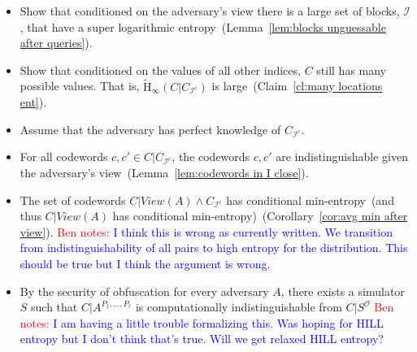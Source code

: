 \documentclass[11pt]{article}
\newcommand{\corref}[1]{\mbox{Corollary~\ref{#1}}}
\newcommand{\lemref}[1]{\mbox{Lemma~\ref{#1}}}
\newcommand{\clref}[1]{\mbox{Claim~\ref{#1}}}
\newcommand{\Hav}{\tilde{\mathrm{H}}_\infty}
\newcommand{\authnote}[2]{{\textcolor{red}{\textsf{#1 notes: }\textcolor{blue}{ #2}}\marginpar{\textcolor{red}{\textbf{!!!!!}}}}}
\newcommand{\authnote}[2]{}
\newcommand{\bnote}[1]{{\authnote{Ben}{#1}}}
\begin{document}
\begin{itemize}
\item Show that conditioned on the adversary's view there is a large set of blocks, $\mathcal{I}$, that have a super logarithmic entropy~(\lemref{lem:blocks unguessable after queries}).
\item Show that conditioned on the values of all other indices, $C$ still has many possible values.  That is, $\Hav(C | C_{\mathcal{I}^c})$ is large~(\clref{cl:many locations ent}).
\item Assume that the adversary has perfect knowledge of $C_{\mathcal{I}^c}$.
\item For all codewords $c, c' \in C| C_{\mathcal{I}^c}$, the codewords $c, c'$ are indistinguishable given the adversary's view~(\lemref{lem:codewords in I close}).
\item The set of codewords $C| View(A) \wedge C_{\mathcal{I}^c}$ has conditional min-entropy~(and thus $C|View(A)$ has conditional min-entropy)~(\corref{cor:avg min after view}).  
\bnote{I think this is wrong as currently written.  We transition from indistinguishability of all pairs to high entropy for the distribution.  This should be true but I think the argument is wrong.}
\item By the security of obfuscation for every adversary $A$, there exists a simulator $S$ such that $C | A^{P_1,..., P_\ell}$ is computationally indistinguishable from $C | S^{\mathcal{O}}$%
\bnote{I am having a little trouble formalizing this.  Was hoping for HILL entropy but I don't think that's true.  Will we get relaxed HILL entropy?}
\end{itemize}
\end{document}
